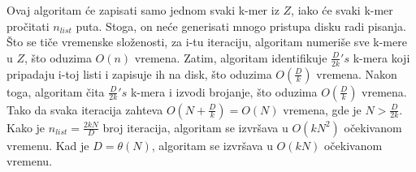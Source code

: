 \documentclass[12pt,oneside]{memoir}
\begin{document}
\begin{comment}
Preciznije, k-meri u $Z$ su podeljeni u $n_{list}$ lista približno slične dužine. Kako disk ima $D$ bitova i svaki k-mer može biti reprezentovan u 2k bitova, svaka lista može čuvati $l_{list} =  \frac{D}{2k}$ k-mera. Kako imamo $N$ k-mera u $Z$, postavlja se $n_{list} = \frac{N}{n_{list}} = \frac{2kN}{D}$. Ovo deljenje se obavlja heš funkcijom $h()$ koja ravnomerno mapira sve k-mere u $n_{list}$ lista. Preciznije, za svaki k-mer $z$ iz $Z$, $z$ se dodeljuje i-toj listi, ako je $h(z)$ \textit{mod} $n_{list} = i$. 

Zatim, svaka lista se dalje deli u podliste, pri čemu je svaka dužine $l_sublist$. Svaka podlista će biti obrađena u memoriji pomoću algoritma $JellyFish$, koji zahteva $\frac{l_{sublist}}{0.7}(2k +32)$ bitova. Kako memorija ima $M$ bitova, tako je $l_{sublist} = \frac{0.7M}{(2k + 32)}$.

Broj podlista je jednak $n_{sublist} = \frac{n_{list}}{n_{sublist}} = \frac{D(2k + 32)}{0.7(2k)M}$. Slično, svaka lista je podeljena u podliste heš funkcijom $h()$. Preciznije, za svaki k-mer $s$ u i-toj listi, $s$ je dodeljeno j-toj podlisti, ako je $(\frac{h(s)}{n_{list}})$ \textit{mod}
$n_{sublist} = j$.

Za svaku podlistu dužine $l_{sublist} = {0.7M}{2k + 32}$, koristeći $M$ bitova,  brojimo pojavljivanja svakog k-mera u podlisti koristeći $JellyFish(d_j, 0.7, h)$ sa slike \ref{fig:6}.

Na slici \ref{fig:5}(c) se može videti primer koji ilustruje izvršavanje algoritma DSK. Neka je $n_{list} = 2$, $n_{sublist} = 2$ and $h(z) = b(z)$ za svaki $z \in Z$. Kako je $n_{list} = 2$, algoritam izvršava 2 iteracije (u nastavku sledi opis nulte iteracije, jer se prva izvršava slično). Prva faza nulte iteracije skenira sve k-mere iz $Z$ i identifikuje svaki k-mer $z \in Z$ koji pripada nultoj listi. Na primer, $h(GG) = 10$, kako je $h(GG)$ \textit{mod} $n_{list} = 0$ i $\frac{h(z)}{n_{list}}$ \textit{mod} $n_{sublist} = 1$, $GG$ pripada nultoj listi i prvoj podlisti. Nakon toga, nulta lista se deli na nultu podlistu $\{CA\}$ i prvu podlistu $\{CG, GG\}$. Obe podliste su zapisane na disku. Druga faza čita svaku podlistu iz memorije i broji k-mere koristeći $JellyFish$ algoritam.

\end{comment}

Ovaj algoritam će zapisati samo jednom svaki k-mer iz $Z$, iako će svaki k-mer pročitati $n_{list}$ puta. Stoga, on neće generisati mnogo pristupa disku radi pisanja. Što se tiče vremenske složenosti, za i-tu iteraciju, algoritam numeriše sve k-mere u $Z$, što oduzima $O(n)$ vremena. Zatim, algoritam identifikuje $\frac{D}{2k}'s$ k-mera koji pripadaju i-toj listi i zapisuje ih na disk, što oduzima $O(\frac{D}{k})$ vremena. Nakon toga, algoritam  čita $\frac{D}{2k}'s$ k-mera i izvodi brojanje, što oduzima $O(\frac{D}{k})$ vremena. Tako da svaka iteracija zahteva $O(N + \frac{D}{k}) = O(N)$ vremena, gde je $N > \frac{D}{2k}$. Kako je $n_{list} = \frac{2kN}{D}$ broj iteracija, algoritam se izvršava u $O(kN^2)$ očekivanom vremenu. Kad je $D = \theta(N)$, algoritam se izvršava u $O(kN)$ očekivanom vremenu.
\end{document}
